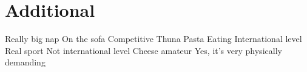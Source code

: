 \documentclass[blue, coloredname, coloredrules]{jeanmichelcv}
\begin{document}
\section{Additional}
\begin{cventrylist}
            {Really big nap}
            {\newline On the sofa}
            {}{}
            {\textnormal{Competitive Thuna Pasta Eating}}
            {International level}
            {}{}
    \cventry{}
            {\textnormal{Real sport}}
            {Not international level}
            {}{}
    \cventry{}
            {\textnormal{Cheese amateur}}
            {Yes, it's very physically demanding}{}{}
\end{cventrylist}
\end{document}
